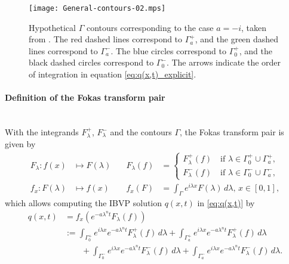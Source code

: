 \documentclass[12pt, oneside, a4paper]{article}
\begin{document}
\begin{figure}[htpb!]
    \centering
    \texttt{[image: General-contours-02.mps]}
    \caption{Hypothetical $\Gamma$ contours corresponding to the case $a=-i$, taken from \cite{Smith2016}. The red dashed lines correspond to $\Gamma_a^+$, and the green dashed lines correspond to $\Gamma_a^-$. The blue circles correspond to $\Gamma_0^+$, and the black dashed circles correspond to $\Gamma_0^-$. The arrows indicate the order of integration in equation \eqref{eq:q(x,t)_explicit}.}
    \label{fig:gamma_smith_fokas}
\end{figure}

\paragraph{Definition of the Fokas transform pair}\label{sec:fokas_transform_pair_defn}\mbox{}\\
With the integrands $F^+_\lambda$, $F^-_\lambda$ and the contours $\Gamma$, the Fokas transform pair is given by
\begin{subequations}\label{eq:fokas_transform_pair}
    \begin{alignat}{3}
        F_\lambda: f(x)&\mapsto F(\lambda)\quad &F_\lambda(f) &= \begin{cases}F^+_\lambda(f)\quad\mbox{if $\lambda\in \Gamma_0^+\cup \Gamma_a^+$},\\F^-_\lambda(f)\quad\mbox{if $\lambda\in \Gamma_0^-\cup \Gamma_a^-$},\end{cases} \label{eq:F_lambda}\\
        f_x:F(\lambda)&\mapsto f(x)\quad &f_x(F) &= \int_\Gamma e^{i\lambda x} F(\lambda)\,d\lambda,\, x\in [0,1], \label{eq:f_x}
    \end{alignat}
\end{subequations}
which allows computing the IBVP solution $q(x,t)$ in \eqref{eq:q(x,t)} by
\begin{equation}\label{eq:q(x,t)_explicit}
    \begin{split}
        q(x,t) &= f_x\left(e^{-a\lambda^n t}F_\lambda(f)\right)\\
        &:= \int_{\Gamma_0^+}e^{i\lambda x}e^{-a\lambda^n t}F_\lambda^+(f)\,d\lambda + \int_{\Gamma_a^+}e^{i\lambda x}e^{-a\lambda^n t}F_\lambda^+(f)\,d\lambda\\
        &\qquad + \int_{\Gamma_0^-}e^{i\lambda x}e^{-a\lambda^n t}F_\lambda^-(f)\,d\lambda + \int_{\Gamma_a^-}e^{i\lambda x}e^{-a\lambda^n t}F_\lambda^-(f)\,d\lambda.
    \end{split}
\end{equation}
\end{document}
